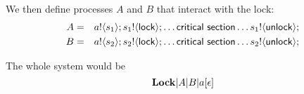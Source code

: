 We then define processes $A$ and $B$ that interact with the lock:
%
\begin{eqnarray*}
	A &=& \out{a}{s_1} \out{s_1}{\lock} \dots \mathsf{critical\ section} \dots \out{s_1}{\unlock} \\
	B &=& \out{a}{s_2} \out{s_2}{\lock} \dots \mathsf{critical\ section} \dots \out{s_2}{\unlock} \\
\end{eqnarray*}

The whole system would be
\[
	\mathbf{Lock} | A | B | a[\epsilon]
\]

